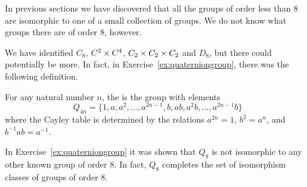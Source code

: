 In previous sections we have discovered that all the groups of order 
less than $8$ are isomorphic to one of a small collection of groups.  
We do not know what groups there are of order $8$, however.

We have identified $C_{8}$, $C^{2} \times C^{4}$, $C_{2} \times C_{2}
\times C_{2}$ and $D_{8}$, but there could potentially be more.  In fact,
in Exercise~\ref{ex:quaterniongroup}, there was the following definition.

\begin{definition}
  For any natural number $n$, the  is
  the group with elements
  \[
    Q_{4n} = \{1, a, a^{2}, \ldots, a^{2n-1}, b, ab, a^{2}b, \ldots, a^{2n-1}b \}
  \]
  where the Cayley table is determined by the relations $a^{2n} = 1$, $b^{2} =
  a^{n}$, and $b^{-1}ab = a^{-1}$.
\end{definition}

In Exercise~\ref{ex:quaterniongroup} it was shown that $Q_{8}$
is not isomorphic to any other known group of order $8$.  In fact, $Q_{8}$
completes the set of isomorphism classes of groups of order $8$.

